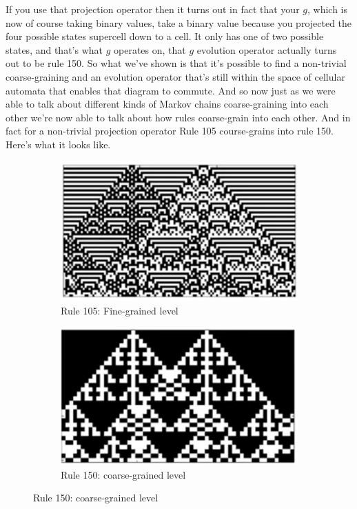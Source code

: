 \documentclass[]{article}
\begin{document}
If you use that projection operator then it turns out in fact that your $g$,
which is now of course taking binary values, take a binary value because you projected the four possible states supercell down to a cell.
It only has one of two possible states,
and that's what $g$ operates on,
that $g$ evolution operator actually turns out to be rule 150.
So what we've shown
is that it's possible to find a non-trivial coarse-graining and an evolution operator that's still within the space of
cellular automata  that enables that diagram to commute.
And so now just as we were able to talk about different kinds of
Markov chains coarse-graining into each other
we're now able to talk about how
rules coarse-grain into each other.
And in fact for a non-trivial projection operator Rule 105 course-grains into rule 150.
Here's what it looks like.
\begin{figure}[H]
	\caption[Rule 105 course-grains into rule 150]{Rule 105 course-grains into rule 150 by a non-trivial projection operator (based on a figure in \cite{israeli2004computational})}\label{fig:105:coarse:grained}
	\begin{subfigure}[t]{0.45\textwidth}
		\caption{Rule 105: Fine-grained level}\label{fig:fine:grain}
		\includegraphics[width=\textwidth]{fine-grain-ca}
	\end{subfigure}
	\hfill
	\begin{subfigure}[t]{0.45\textwidth}
		\caption{Rule 150: coarse-grained level}
		\includegraphics[width=\textwidth]{coarse-grain-ca}
	\end{subfigure}
\end{figure}
\end{document}
